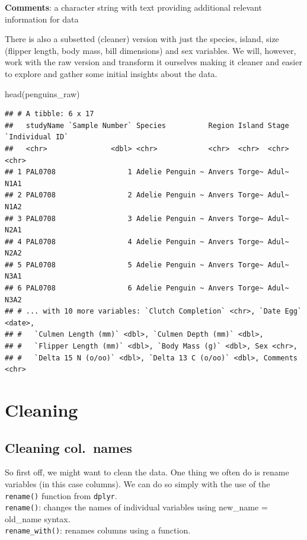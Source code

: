 \documentclass[
]{book}
\newenvironment{Shaded}{\begin{snugshade}}{\end{snugshade}}
\newcommand{\FunctionTok}[1]{\textcolor[rgb]{0.00,0.00,0.00}{#1}}
\newcommand{\NormalTok}[1]{#1}
\begin{document}
\textbf{Comments}: a character string with text providing additional relevant information for data

There is also a subsetted (cleaner) version with just the species, island, size (flipper length, body mass, bill dimensions) and sex variables.
We will, however, work with the raw version and transform it ourselves making it cleaner and easier to explore and gather some initial insights about the data.

\begin{Shaded}
\begin{Highlighting}[]
\FunctionTok{head}\NormalTok{(penguins\_raw)}
\end{Highlighting}
\end{Shaded}

\begin{verbatim}
## # A tibble: 6 x 17
##   studyName `Sample Number` Species          Region Island Stage `Individual ID`
##   <chr>               <dbl> <chr>            <chr>  <chr>  <chr> <chr>          
## 1 PAL0708                 1 Adelie Penguin ~ Anvers Torge~ Adul~ N1A1           
## 2 PAL0708                 2 Adelie Penguin ~ Anvers Torge~ Adul~ N1A2           
## 3 PAL0708                 3 Adelie Penguin ~ Anvers Torge~ Adul~ N2A1           
## 4 PAL0708                 4 Adelie Penguin ~ Anvers Torge~ Adul~ N2A2           
## 5 PAL0708                 5 Adelie Penguin ~ Anvers Torge~ Adul~ N3A1           
## 6 PAL0708                 6 Adelie Penguin ~ Anvers Torge~ Adul~ N3A2           
## # ... with 10 more variables: `Clutch Completion` <chr>, `Date Egg` <date>,
## #   `Culmen Length (mm)` <dbl>, `Culmen Depth (mm)` <dbl>,
## #   `Flipper Length (mm)` <dbl>, `Body Mass (g)` <dbl>, Sex <chr>,
## #   `Delta 15 N (o/oo)` <dbl>, `Delta 13 C (o/oo)` <dbl>, Comments <chr>
\end{verbatim}

\hypertarget{cleaning}{%
\section{Cleaning}\label{cleaning}}

\hypertarget{cleaning-col.-names}{%
\subsection{Cleaning col.~names}\label{cleaning-col.-names}}

So first off, we might want to clean the data.
One thing we often do is rename variables (in this case columns).
We can do so simply with the use of the \texttt{rename()} function from \texttt{dplyr}.\\
\texttt{rename()}: changes the names of individual variables using new\_name = old\_name syntax.\\
\texttt{rename\_with()}: renames columns using a function.
\end{document}
